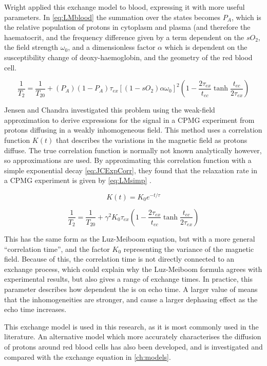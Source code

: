 Wright\cite{WrightEstimatingoxygensaturation1991} applied this exchange model to blood, expressing it with more useful parameters.
In \autoref{eq:LMblood} the summation over the states becomes $P_A$, which is the relative population of protons in cytoplasm and plasma (and therefore the haematocrit, and the frequency difference given by a term dependent on the $sO_2$, the field strength $\omega_0$, and a dimensionless factor $\alpha$ which is dependent on the susceptibility change of deoxy-haemoglobin, and the geometry of the red blood cell.

\begin{equation}
\label{eq:LMblood}
\frac{1}{T_2} = \frac{1}{T_{20}} + (P_A)(1 - P_A)\tau_{ex} \left[(1-sO_2)\alpha\omega_0\right]^2 \left(1 - \frac{2\tau_{ex}}{t_{ec}} \tanh{\frac{t_{ec}}{2\tau_{ex}} } \right)
\end{equation}

Jensen and Chandra investigated this problem using the weak-field approximation to derive expressions for the signal in a CPMG experiment from protons diffusing in a weakly inhomogeneous field\cite{JensenNMRrelaxationtissues2000}.
This method uses a correlation function $K(t)$ that describes the variations in the magnetic field as protons diffuse.
The true correlation function is normally not known analytically however, so approximations are used.
By approximating this correlation function with a simple exponential decay \autoref{eq:JCExpCorr}, they found that the relaxation rate in a CPMG experiment is given by \autoref{eq:LMsimp} \cite{JensenNMRrelaxationtissues2000}.

\begin{equation}
K(t) = K_0 e^{-t/\tau}
\label{eq:JCExpCorr}
\end{equation}

\begin{equation}
\label{eq:LMsimp}
\frac{1}{T_2} = \frac{1}{T_{20}} + \gamma^2 K_0 \tau_{ex} (1 - \frac{2\tau_{ex}}{t_{ec}} \tanh{\frac{t_{ec}}{2\tau_{ex}}})
\end{equation}

This has the same form as the Luz-Meiboom equation, but with a more general ``correlation time'', and the factor $K_0$ representing the variance of the magnetic field.
Because of this, the correlation time is not directly connected to an exchange process, which could explain why the Luz-Meiboom formula agrees with experimental results, but also gives a range of exchange times.
In practice, this \Kzero parameter describes how dependent the \Ttwo is on echo time.
A larger value of \Kzero means that the inhomogeneities are stronger, and cause a larger dephasing effect as the echo time increases.

This exchange model is used in this research, as it is most commonly used in the literature.
An alternative model which more accurately characterises the diffusion of protons around red blood cells has also been developed\cite{JensenNMRrelaxationtissues2000}, and is investigated and compared with the exchange equation in \autoref{ch:models}.
